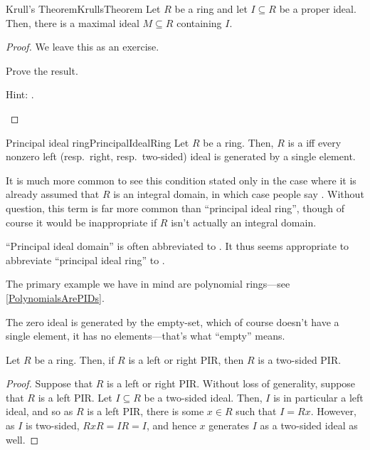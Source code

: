 \begin{thm}{Krull's Theorem}{KrullsTheorem}
	Let $R$ be a ring and let $I\subseteq R$ be a proper ideal.  Then, there is a maximal ideal $M\subseteq R$ containing $I$.
	\begin{proof}
		We leave this as an exercise.
		\begin{exr}[breakable=false]{}{}
			Prove the result.
			\begin{rmk}
				Hint:  .
			\end{rmk}
		\end{exr}
	\end{proof}
\end{thm}
\begin{dfn}{Principal ideal ring}{PrincipalIdealRing}
	Let $R$ be a ring.  Then, $R$ is a  iff every nonzero left (resp.~right, resp.~two-sided) ideal is generated by a single element.
	\begin{rmk}
		It is much more common to see this condition stated only in the case where it is already assumed that $R$ is an integral domain, in which case people say .  Without question, this term is far more common than ``principal ideal ring'', though of course it would be inappropriate if $R$ isn't actually an integral domain.
	\end{rmk}
	\begin{rmk}
		``Principal ideal domain'' is often abbreviated to .  It thus seems appropriate to abbreviate ``principal ideal ring'' to \index{PIR}.
	\end{rmk}
	\begin{rmk}
		The primary example we have in mind are polynomial rings---see \cref{PolynomialsArePIDs}.
	\end{rmk}
	\begin{rmk}
		The zero ideal is generated by the empty-set, which of course doesn't have a single element, it has no elements---that's what ``empty'' means.
	\end{rmk}
\end{dfn}
\begin{prp}{}{}
	Let $R$ be a ring.  Then, if $R$ is a left or right PIR, then $R$ is a two-sided PIR.
	\begin{proof}
		Suppose that $R$ is a left or right PIR.  Without loss of generality, suppose that $R$ is a left PIR.  Let $I\subseteq R$ be a two-sided ideal.  Then, $I$ is in particular a left ideal, and so as $R$ is a left PIR, there is some $x\in R$ such that $I=Rx$.  However, as $I$ is two-sided, $RxR=IR=I$, and hence $x$ generates $I$ as a two-sided ideal as well.
	\end{proof}
\end{prp}

